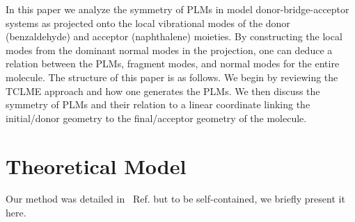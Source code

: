 In this paper we analyze the symmetry of PLMs in model donor-bridge-acceptor systems as projected onto the local
 vibrational modes of the  donor (benzaldehyde)    and  acceptor (naphthalene) moieties.    By constructing the local modes
from the dominant normal modes in the projection,  one can deduce a relation between the PLMs,
fragment modes,  and normal modes for the entire molecule.
The structure of this paper is as follows.
We begin by reviewing the TCLME approach and how one generates the PLMs.  We then
discuss the symmetry  of PLMs and their relation to a linear coordinate linking the
initial/donor geometry to the final/acceptor geometry of the molecule.

\section{Theoretical Model}

Our method was detailed in ~Ref. \cite{yang2014intramolecular} but to be self-contained, we briefly present it here.


